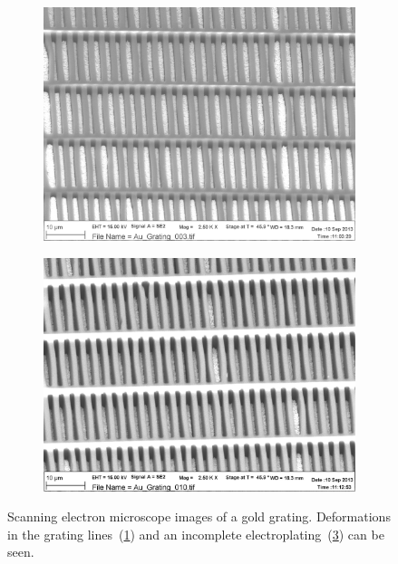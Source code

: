 \begin{figure}[htb]
    \centering
    \begin{subfigure}[b]{.49\textwidth}
    \centering
    \includegraphics[width=\textwidth]{gfx/Au_Grating_003.png}
    \caption{}
    \label{fig:deformazioni}
    \end{subfigure}
    \hfill
    \begin{subfigure}[b]{.49\textwidth}
    \centering
    \includegraphics[width=\textwidth]{gfx/Au_Grating_010.png}
    \caption{}
    \label{fig:galvanizzazione}
    \end{subfigure}
    \caption[Electron microscope images of a gold grating.]{Scanning
        electron microscope images of a gold grating.
        Deformations in the grating lines~(\ref{fig:deformazioni}) and an
        incomplete electroplating~(\ref{fig:galvanizzazione}) can be seen.
    }
\end{figure}


